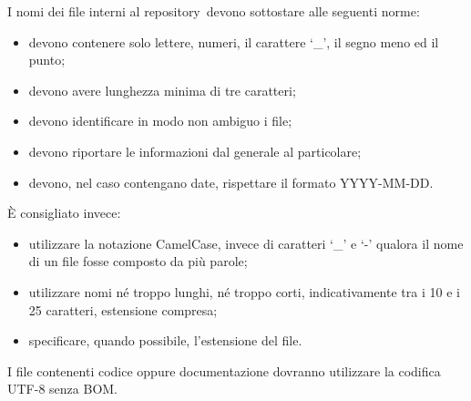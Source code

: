 \documentclass[../NormeProgetto.tex]{subfiles}
\begin{document}
					I nomi dei file interni al repository\g\ devono sottostare alle seguenti norme:
					\begin{itemize}
						\item devono contenere solo lettere, numeri, il carattere `\_', il segno meno ed il punto;
						\item devono avere lunghezza minima di tre caratteri;
						\item devono identificare in modo non ambiguo i file;
						\item devono riportare le informazioni dal generale al particolare;
						\item devono, nel caso contengano date, rispettare il formato YYYY-MM-DD.
					\end{itemize}
					È consigliato invece:
					\begin{itemize}
						\item utilizzare la notazione CamelCase\g, invece di caratteri `\_' e `-' qualora il nome di un file fosse composto da più parole;
						\item utilizzare nomi né troppo lunghi, né troppo corti, indicativamente tra i 10 e i 25 caratteri, estensione compresa;
						\item specificare, quando possibile, l'estensione del file.
					\end{itemize}
					I file contenenti codice oppure documentazione dovranno utilizzare la codifica UTF-8 senza BOM\g.
\newpage
\end{document}
